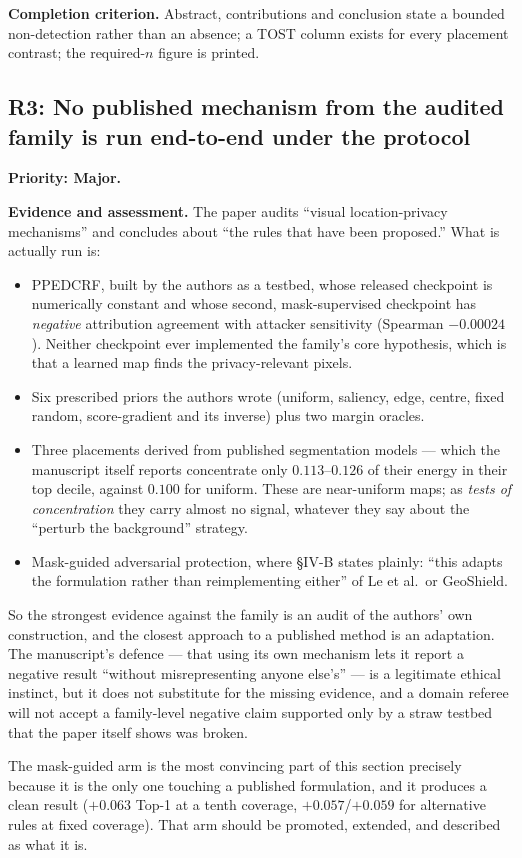 \documentclass[11pt,a4paper]{article}
\newcommand{\finding}[3]{\subsection{#1: #3}\label{rev:#1}\textbf{Priority: #2.}}
\newcommand{\evidence}{\par\textbf{Evidence and assessment.} }
\newcommand{\acceptance}{\par\textbf{Completion criterion.} }
\begin{document}
\acceptance
Abstract, contributions and conclusion state a bounded non-detection rather
than an absence; a TOST column exists for every placement contrast; the
required-$n$ figure is printed.

\finding{R3}{Major}{No published mechanism from the audited family is run
end-to-end under the protocol}

\evidence
The paper audits ``visual location-privacy mechanisms'' and concludes about
``the rules that have been proposed.'' What is actually run is:

\begin{itemize}
\item PPEDCRF, built by the authors as a testbed, whose released checkpoint is
  numerically constant and whose second, mask-supervised checkpoint has
  \emph{negative} attribution agreement with attacker sensitivity (Spearman
  $-0.00024$). Neither checkpoint ever implemented the family's core
  hypothesis, which is that a learned map finds the privacy-relevant pixels.
\item Six prescribed priors the authors wrote (uniform, saliency, edge, centre,
  fixed random, score-gradient and its inverse) plus two margin oracles.
\item Three placements derived from published segmentation models --- which the
  manuscript itself reports concentrate only $0.113$--$0.126$ of their energy in
  their top decile, against $0.100$ for uniform. These are near-uniform maps;
  as \emph{tests of concentration} they carry almost no signal, whatever they
  say about the ``perturb the background'' strategy.
\item Mask-guided adversarial protection, where \S IV-B states plainly: ``this
  adapts the formulation rather than reimplementing either'' of Le et al.\ or
  GeoShield.
\end{itemize}

So the strongest evidence against the family is an audit of the authors' own
construction, and the closest approach to a published method is an adaptation.
The manuscript's defence --- that using its own mechanism lets it report a
negative result ``without misrepresenting anyone else's'' --- is a legitimate
ethical instinct, but it does not substitute for the missing evidence, and a
domain referee will not accept a family-level negative claim supported only by
a straw testbed that the paper itself shows was broken.

The mask-guided arm is the most convincing part of this section precisely
because it is the only one touching a published formulation, and it produces a
clean result ($+0.063$ Top-1 at a tenth coverage, $+0.057$/$+0.059$ for
alternative rules at fixed coverage). That arm should be promoted, extended,
and described as what it is.
\end{document}
